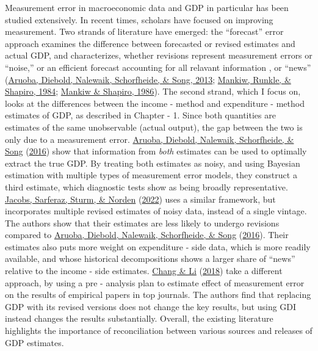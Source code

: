 \documentclass[12pt,nobind, a4paper]{reedthesis}
\begin{document}
 Measurement error in macroeconomic data and GDP in particular has been studied extensively. In recent times, scholars have focused on improving measurement. Two strands of literature have emerged: the ``forecast'' error approach examines the difference between forecasted or revised estimates and actual GDP, and characterizes, whether revisions represent measurement errors or ``noise,'' or an efficient forecast accounting for all relavant information , or ``news'' (\protect\hyperlink{ref-aruoba_improving_2013}{Aruoba, Diebold, Nalewaik, Schorfheide, \& Song, 2013}; \protect\hyperlink{ref-mankiw_are_1984}{Mankiw, Runkle, \& Shapiro, 1984}; \protect\hyperlink{ref-mankiw_news_1986}{Mankiw \& Shapiro, 1986}). The second strand, which I focus on, looks at the differences between the income - method and expenditure - method estimates of GDP, as described in Chapter - 1. Since both quantities are estimates of the same unobservable (actual output), the gap between the two is only due to a measurement error. \protect\hyperlink{ref-aruoba_improving_2016}{Aruoba, Diebold, Nalewaik, Schorfheide, \& Song} (\protect\hyperlink{ref-aruoba_improving_2016}{2016}) show that information from \emph{both} estimates can be used to optimally extract the true GDP. By treating both estimates as noisy, and using Bayesian estimation with multiple types of measurement error models, they construct a third estimate, which diagnostic tests show as being broadly representative. \protect\hyperlink{ref-jacobs_can_2022}{Jacobs, Sarferaz, Sturm, \& Norden} (\protect\hyperlink{ref-jacobs_can_2022}{2022}) uses a similar framework, but incorporates multiple revised estimates of noisy data, instead of a single vintage. The authors show that their estimates are less likely to undergo revisions compared to \protect\hyperlink{ref-aruoba_improving_2016}{Aruoba, Diebold, Nalewaik, Schorfheide, \& Song} (\protect\hyperlink{ref-aruoba_improving_2016}{2016}). Their estimates also puts more weight on expenditure - side data, which is more readily available, and whose historical decompositions shows a larger share of ``news'' relative to the income - side estimates. \protect\hyperlink{ref-chang_measurement_2018}{Chang \& Li} (\protect\hyperlink{ref-chang_measurement_2018}{2018}) take a different approach, by using a pre - analysis plan to estimate effect of measurement error on the results of empirical papers in top journals. The authors find that replacing GDP with its revised versions does not change the key results, but using GDI instead changes the results substantially. Overall, the existing literature highlights the importance of reconciliation between various sources and releases of GDP estimates.
 \linebreak
\end{document}
